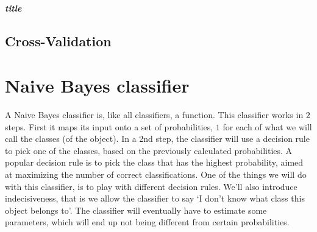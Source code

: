 \documentclass{report}
\theoremstyle{definition}
\begin{document}
\paragraph{title} 

	\section{Cross-Validation}

\chapter{Naive Bayes classifier} 
A Naive Bayes classifier is, like all classifiers, a function. This classifier works in $2$ steps. First it maps its input onto a set of probabilities, $1$ for each of what we will call the classes (of the object). In a 2nd step, the classifier will use a decision rule to pick one of the classes, based on the previously calculated probabilities. A popular decision rule is to pick the class that has the highest probability, aimed at maximizing the number of correct classifications. One of the things we will do with this classifier, is to play with different decision rules. We'll also introduce indecisiveness, that is we allow the classifier to say  \lq I don't know what class this object belongs to'. The classifier will eventually have to estimate some parameters, which will end up not being different from certain probabilities.
\end{document}
